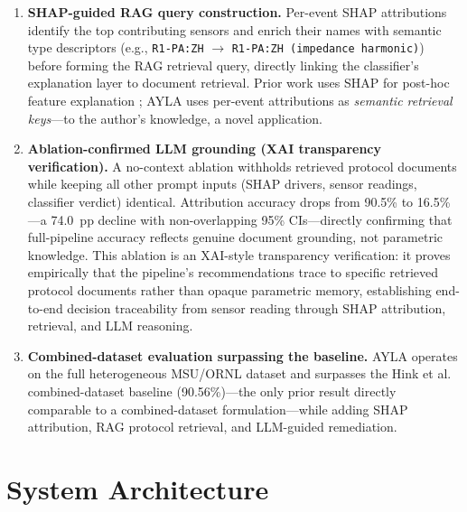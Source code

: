 \documentclass[twocolumn, 10pt, letterpaper]{article}
\begin{document}
\begin{enumerate}
    \item[\textbf{C1.}] \textbf{SHAP-guided RAG query construction.}
          Per-event SHAP attributions identify the top contributing sensors
          and enrich their names with semantic type descriptors
          (e.g., \texttt{R1-PA:ZH} $\rightarrow$ \texttt{R1-PA:ZH (impedance harmonic)})
          before forming the RAG retrieval query, directly linking the classifier's
          explanation layer to document retrieval.
          Prior work uses SHAP for post-hoc feature explanation
          \cite{shap_ids,shapgrid2026};
          AYLA uses per-event attributions as \textit{semantic retrieval keys}---to
          the author's knowledge, a novel application.

    \item[\textbf{C2.}] \textbf{Ablation-confirmed LLM grounding (XAI transparency verification).}
          A no-context ablation withholds retrieved protocol documents while keeping
          all other prompt inputs (SHAP drivers, sensor readings, classifier verdict)
          identical.
          Attribution accuracy drops from 90.5\% to 16.5\%---a 74.0~pp decline
          with non-overlapping 95\% CIs---directly confirming that full-pipeline
          accuracy reflects genuine document grounding, not parametric knowledge.
          This ablation is an XAI-style transparency verification: it proves
          empirically that the pipeline's recommendations trace to specific
          retrieved protocol documents rather than opaque parametric memory,
          establishing end-to-end decision traceability from sensor reading
          through SHAP attribution, retrieval, and LLM reasoning.

    \item[\textbf{C3.}] \textbf{Combined-dataset evaluation surpassing the baseline.}
          AYLA operates on the full heterogeneous MSU/ORNL dataset and surpasses the
          Hink et al.\ \cite{hink2014ml} combined-dataset baseline (90.56\%)---the only
          prior result directly comparable to a combined-dataset formulation---while
          adding SHAP attribution, RAG protocol retrieval, and LLM-guided remediation.
\end{enumerate}

\section{System Architecture}
\label{sec:system}
\end{document}
